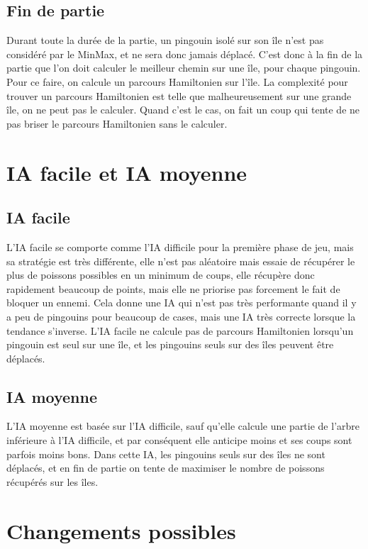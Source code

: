 \documentclass{report}
\begin{document}
\section{Fin de partie}
Durant toute la durée de la partie, un pingouin isolé sur son île n'est pas considéré par le MinMax, et ne sera donc jamais déplacé.
C'est donc à la fin de la partie que l'on doit calculer le meilleur chemin sur une île, pour chaque pingouin.
\newline 
Pour ce faire, on calcule un parcours Hamiltonien sur l'île. La complexité pour trouver un parcours Hamiltonien est telle que malheureusement sur une grande île, on ne peut pas le calculer. Quand c'est le cas, on fait un coup qui tente de ne pas briser le parcours Hamiltonien sans le calculer.

\chapter{IA facile et IA moyenne}
\section{IA facile}
L'IA facile se comporte comme l'IA difficile pour la première phase de jeu, mais sa stratégie est très différente, elle n'est pas aléatoire mais essaie de récupérer le plus de poissons possibles en un minimum de coups, elle récupère donc rapidement beaucoup de points, mais elle ne priorise pas forcement le fait de bloquer un ennemi.
Cela donne une IA qui n'est pas très performante quand il y a peu de pingouins pour beaucoup de cases, mais une IA très correcte lorsque la tendance s'inverse.
\newline
L'IA facile ne calcule pas de parcours Hamiltonien lorsqu'un pingouin est seul sur une île, et les pingouins seuls sur des îles peuvent être  déplacés. 

\section{IA moyenne}
L'IA moyenne est basée sur l'IA difficile, sauf qu'elle calcule une partie de l'arbre inférieure à l'IA difficile, et par conséquent elle anticipe moins et ses coups sont parfois moins bons.
Dans cette IA, les pingouins seuls sur des îles ne sont déplacés, et en fin de partie on tente de maximiser le nombre de poissons récupérés sur les îles.


\chapter{Changements possibles}
\end{document}
